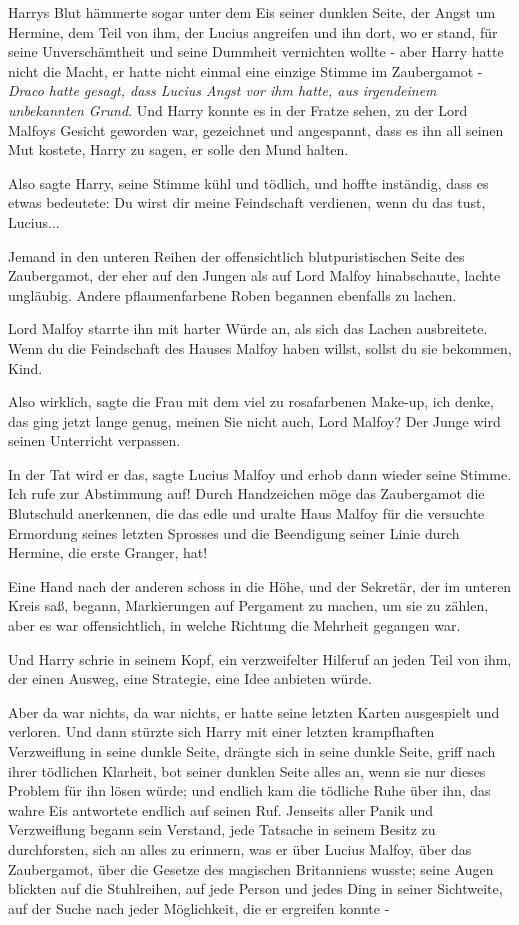 Harrys Blut hämmerte sogar unter dem Eis seiner dunklen Seite, der Angst um
Hermine, dem Teil von ihm, der Lucius angreifen und ihn dort, wo er stand, für
seine Unverschämtheit und seine Dummheit vernichten wollte - aber Harry hatte
nicht die Macht, er hatte nicht einmal eine einzige Stimme im Zaubergamot -
\emph{Draco hatte gesagt, dass Lucius Angst vor ihm hatte, aus irgendeinem
unbekannten Grund}. Und Harry konnte es in der Fratze sehen, zu der Lord Malfoys
Gesicht geworden war, gezeichnet und angespannt, dass es ihn all seinen Mut
kostete, Harry zu sagen, er solle den Mund halten.

Also sagte Harry, seine Stimme kühl und tödlich, und hoffte inständig, dass es
etwas bedeutete: \glqq{}Du wirst dir meine Feindschaft verdienen, wenn du das
tust, Lucius...\grqq{}

Jemand in den unteren Reihen der offensichtlich blutpuristischen Seite des
Zaubergamot, der eher auf den Jungen als auf Lord Malfoy hinabschaute, lachte
ungläubig. Andere pflaumenfarbene Roben begannen ebenfalls zu lachen.

Lord Malfoy starrte ihn mit harter Würde an, als sich das Lachen ausbreitete.
\glqq{}Wenn du die Feindschaft des Hauses Malfoy haben willst, sollst du sie
bekommen, Kind.

\glqq{}Also wirklich\grqq{}, sagte die Frau mit dem viel zu rosafarbenen Make-up,
\glqq{}ich denke, das ging jetzt lange genug, meinen Sie nicht auch, Lord Malfoy?
Der Junge wird seinen Unterricht verpassen.\grqq{}

\glqq{}In der Tat wird er das\grqq{}, sagte Lucius Malfoy und erhob dann wieder
seine Stimme. \glqq{}Ich rufe zur Abstimmung auf! Durch Handzeichen möge das
Zaubergamot die Blutschuld anerkennen, die das edle und uralte Haus Malfoy für
die versuchte Ermordung seines letzten Sprosses und die Beendigung seiner Linie
durch Hermine, die erste Granger, hat!\grqq{}

Eine Hand nach der anderen schoss in die Höhe, und der Sekretär, der im unteren
Kreis saß, begann, Markierungen auf Pergament zu machen, um sie zu zählen, aber
es war offensichtlich, in welche Richtung die Mehrheit gegangen war.

Und Harry schrie in seinem Kopf, ein verzweifelter Hilferuf an jeden Teil von
ihm, der einen Ausweg, eine Strategie, eine Idee anbieten würde.

Aber da war nichts, da war nichts, er hatte seine letzten Karten ausgespielt und
verloren. Und dann stürzte sich Harry mit einer letzten krampfhaften
Verzweiflung in seine dunkle Seite, drängte sich in seine dunkle Seite, griff
nach ihrer tödlichen Klarheit, bot seiner dunklen Seite alles an, wenn sie nur
dieses Problem für ihn lösen würde; und endlich kam die tödliche Ruhe über ihn,
das wahre Eis antwortete endlich auf seinen Ruf. Jenseits aller Panik und
Verzweiflung begann sein Verstand, jede Tatsache in seinem Besitz zu
durchforsten, sich an alles zu erinnern, was er über Lucius Malfoy, über das
Zaubergamot, über die Gesetze des magischen Britanniens wusste; seine Augen
blickten auf die Stuhlreihen, auf jede Person und jedes Ding in seiner
Sichtweite, auf der Suche nach jeder Möglichkeit, die er ergreifen konnte -

